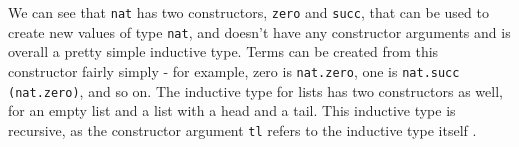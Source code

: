 We can see that \lstinline{nat} has two constructors, \lstinline{zero} and \lstinline{succ}, that can be used to create new values of type \lstinline{nat}, and doesn't have any constructor arguments and is overall a pretty simple inductive type. Terms can be created from this constructor fairly simply - for example, zero is \lstinline{nat.zero}, one is \lstinline{nat.succ (nat.zero)}, and so on. The inductive type for lists has two constructors as well, for an empty list and a list with a head and a tail. This inductive type is recursive, as the constructor argument \lstinline{tl} refers to the inductive type itself \cite{lean:reference}.
